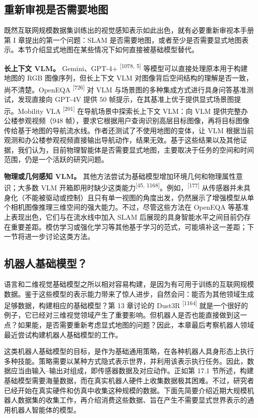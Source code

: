 \subsection{重新审视是否需要地图}

既然互联网规模数据集训练出的视觉感知表示如此出色，就有必要重新审视本手册第 I 章提出的第一个问题：SLAM 是否需要地图，或者至少是否需要显式地图表示。本节介绍显式地图在某些情况下如何直接被基础模型替代。

\textbf{长上下文 VLM。} Gemini、GPT-4+ \textsuperscript{[1078, 5]} 等模型可以直接处理原本用于构建地图的 RGB 图像序列，但长上下文 VLM 对图像背后空间结构的理解是否一致，尚不清楚。OpenEQA \textsuperscript{[726]} 对 VLM 与场景图的多种集成方式进行具身问答基准测试，发现直接向 GPT-4V 提供 50 帧提示，在其基准上优于提供显式场景图提示。Mobility VLA \textsuperscript{[201]} 在导航场景中探索长上下文 VLM：向 VLM 提供完整办公楼参观视频（948 帧），要求它根据用户查询识别高层目标图像，再将目标图像传给基于地图的导航流水线。作者还测试了不使用地图的变体，让 VLM 根据当前观测和办公楼参观视频直接输出导航动作，结果无效。基于这些结果以及其他证据，我们认为，目前物理智能体是否需要显式地图，主要取决于任务的空间和时间范围，仍是一个活跃的研究问题。

\textbf{物理或几何感知 VLM。} 其他方法尝试为基础模型增加环境几何和物理属性意识；大多数 VLM 开箱即用时缺少这类能力\textsuperscript{[45, 1168]}。例如，\textsuperscript{[177]} 从传感器并未具身化（不能被驱动或控制）且只有单一视图的角度出发，仍然展示了增强模型从单个相机图像推理三维空间的强大能力。不过，尽管这些方法在 OpenEQA 等基准上表现出色，它们与在流水线中加入 SLAM 后展现的具身智能水平之间目前仍存在重要差距。模仿学习或强化学习等其他基于学习的范式，可能填补这一差距；下一节将进一步讨论这类方法。

\subsection{机器人基础模型？}

语言和二维视觉基础模型之所以相对容易构建，是因为有可用于训练的互联网规模数据。鉴于这些模型的表示能力带来了惊人进步，自然会问：能否为其他领域生成足够数据，构建相应的基础模型？第 13 章讨论的 Dust3R \textsuperscript{[1164]} 就是一个很好的例子，它已经对三维视觉领域产生了重要影响。但机器人是否也能直接做到这一点？如果能，是否需要重新考虑显式地图的问题？因此，本章最后考察机器人领域最近尝试构建机器人基础模型的工作。

这类机器人基础模型的目标，是作为基础通用策略，在各种机器人具身形态上执行多种技能。策略需要以某种方式隐式表示世界，并利用该表示执行任务。因此，数据应当由输入--输出对组成，即传感器数据及对应动作。正如第 17.1 节所述，构建基础模型需要海量数据，而在真实机器人硬件上收集数据极其困难。不过，研究者已经开始在真实硬件和仿真中收集这种规模的数据。下面先简要介绍近期大规模机器人数据集的收集工作，再介绍消费这些数据、旨在产生不需要显式世界表示的通用机器人智能体的模型。


